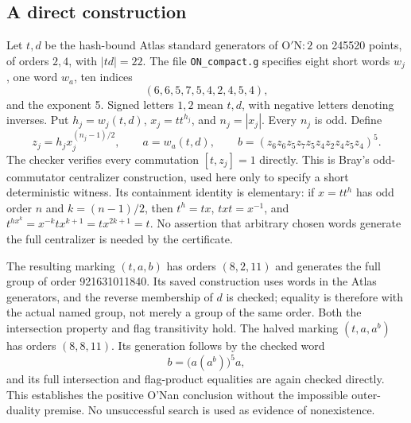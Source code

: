 \documentclass[11pt]{article}
\newcommand{\ON}{\mathrm{O'N}}
\begin{document}
\subsection*{A direct construction}
Let $t,d$ be the hash-bound Atlas standard generators of $\ON:2$ on 245520 points, of orders $2,4$, with $|td|=22$. The file \texttt{ON\_compact.g} specifies eight short words $w_j$, one word $w_a$, ten indices
\[
 (6,6,5,7,5,4,2,4,5,4),
\]
and the exponent 5. Signed letters $1,2$ mean $t,d$, with negative letters denoting inverses. Put $h_j=w_j(t,d)$, $x_j=t t^{h_j}$, and $n_j=|x_j|$. Every $n_j$ is odd. Define
\[
 z_j=h_jx_j^{(n_j-1)/2},\qquad
 a=w_a(t,d),\qquad b=(z_6z_6z_5z_7z_5z_4z_2z_4z_5z_4)^5.
\]
The checker verifies every commutation $[t,z_j]=1$ directly. This is Bray's odd-commutator centralizer construction\cite{Bray}, used here only to specify a short deterministic witness. Its containment identity is elementary: if $x=t t^h$ has odd order $n$ and $k=(n-1)/2$, then $t^h=tx$, $t x t=x^{-1}$, and $t^{h x^k}=x^{-k}t x^{k+1}=t x^{2k+1}=t$. No assertion that arbitrary chosen words generate the full centralizer is needed by the certificate.

The resulting marking $(t,a,b)$ has orders $(8,2,11)$ and generates the full group of order 921631011840. Its saved construction uses words in the Atlas generators, and the reverse membership of $d$ is checked; equality is therefore with the actual named group, not merely a group of the same order. Both the intersection property and flag transitivity hold. The halved marking $(t,a,a^b)$ has orders $(8,8,11)$. Its generation follows by the checked word
\[
 b=\bigl(a(a^b)\bigr)^5a,
\]
and its full intersection and flag-product equalities are again checked directly. This establishes the positive O'Nan conclusion without the impossible outer-duality premise. No unsuccessful search is used as evidence of nonexistence.
\end{document}
